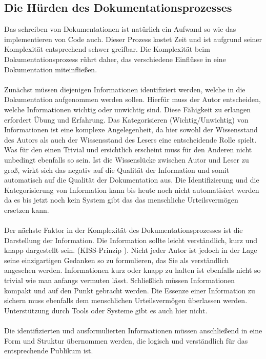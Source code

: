 \documentclass[a4paper,12pt]{scrartcl}
\begin{document}
\subsection{Die Hürden des Dokumentationsprozesses}
Das schreiben von Dokumentationen ist natürlich ein Aufwand so wie das implementieren von Code auch. Dieser Prozess kostet Zeit und ist aufgrund seiner Komplexität entsprechend schwer greifbar. Die Komplexität beim Dokumentationsprozess rührt daher, das verschiedene Einflüsse in eine Dokumentation miteinfließen.
\\\\
Zunächst müssen diejenigen Informationen identifiziert werden, welche in die Dokumentation aufgenommen werden sollen. Hierfür muss der Autor entscheiden, welche Informationen wichtig oder unwichtig sind. Diese Fähigkeit zu erlangen erfordert Übung und Erfahrung. Das Kategorisieren (Wichtig/Unwichtig) von Informationen ist eine komplexe Angelegenheit, da hier sowohl der Wissensstand des Autors als auch der Wissensstand des Lesers eine entscheidende Rolle spielt. Was für den einen Trivial und ersichtlich erscheint muss für den Anderen nicht unbedingt ebenfalls so sein. Ist die Wissenslücke zwischen Autor und Leser zu groß, wirkt sich das negativ auf die Qualität der Information und somit automatisch auf die Qualität der Dokumentation aus. Die Identifizierung und die Kategorisierung von Information kann bis heute noch nicht automatisiert werden da es bis jetzt noch kein System gibt das das menschliche Urteilsvermögen ersetzen kann.
\\\\
Der nächste Faktor in der Komplexität des Dokumentationsprozesses ist die Darstellung der Information. Die Information sollte leicht verständlich, kurz und knapp dargestellt sein. (KISS-Prinzip\footnotemark
). Nicht jeder Autor ist jedoch in der Lage seine einzigartigen Gedanken so zu formulieren, das Sie als verständlich angesehen werden. Informationen kurz oder knapp zu halten ist ebenfalls nicht so trivial wie man anfangs vermuten lässt. Schließlich müssen Informationen kompakt und auf den Punkt gebracht werden. Die Essenze einer Information zu sichern muss ebenfalls dem menschlichen Urteilsvermögen überlassen werden. Unterstützung durch Tools oder Systeme gibt es auch hier nicht.
\\\\
Die identifizierten und ausformulierten Informationen müssen anschließend in eine Form und Struktur übernommen werden, die logisch und verständlich für das entsprechende Publikum ist. 
\end{document}
